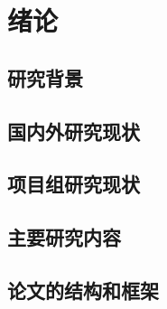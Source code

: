 
\chapter{绪论}

\section{研究背景}

\section{国内外研究现状}

\section{项目组研究现状}

\section{主要研究内容}

\section{论文的结构和框架}
